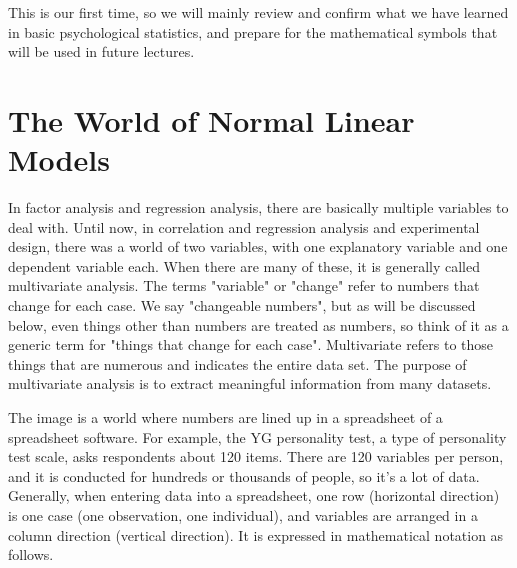 \documentclass{ltjsbook}
\begin{document}
This is our first time, so we will mainly review and confirm what we have learned in basic psychological statistics, and prepare for the mathematical symbols that will be used in future lectures.

\section{The World of Normal Linear Models}

In factor analysis and regression analysis, there are basically multiple variables to deal with. Until now, in correlation and regression analysis and experimental design, there was a world of two variables, with one explanatory variable and one dependent variable each. When there are many of these, it is generally called multivariate analysis. The terms "variable" or "change" refer to numbers that change for each case. We say "changeable numbers", but as will be discussed below, even things other than numbers are treated as numbers, so think of it as a generic term for "things that change for each case". Multivariate refers to those things that are numerous and indicates the entire data set. The purpose of multivariate analysis is to extract meaningful information from many datasets.

The image is a world where numbers are lined up in a spreadsheet of a spreadsheet software. For example, the YG personality test, a type of personality test scale, asks respondents about 120 items. There are 120 variables per person, and it is conducted for hundreds or thousands of people, so it's a lot of data. Generally, when entering data into a spreadsheet, one row (horizontal direction) is one case (one observation, one individual), and variables are arranged in a column direction (vertical direction). It is expressed in mathematical notation as follows.
\end{document}
